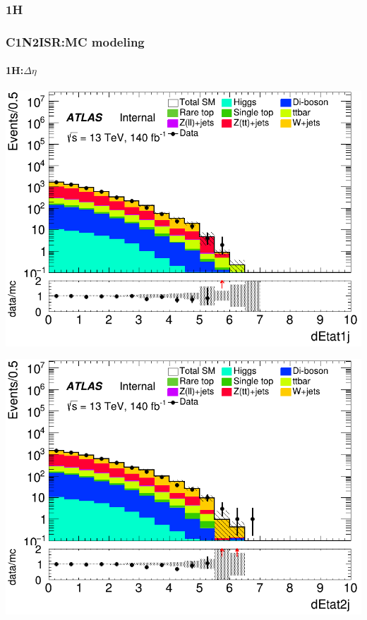 \documentclass[usenames,dvipsnames]{beamer}
\begin{document}
\subsubsection{1H}
\begin{frame}
\frametitle{C1N2ISR:MC modeling}
\framesubtitle{1H:\quad $\Delta\eta$}
    \begin{minipage}{0.32\textwidth}
        \centering
        \includegraphics[width=\textwidth]{graphics/H_met/H_met_dEtat1j.png}
    \end{minipage}
    \hfill
    \begin{minipage}{0.32\textwidth}
        \centering
        \includegraphics[width=\textwidth]{graphics/H_met/H_met_dEtat2j.png}
    \end{minipage}
    \hfill
    \begin{minipage}{0.32\textwidth}

\end{minipage}
\end{frame}
\end{document}
